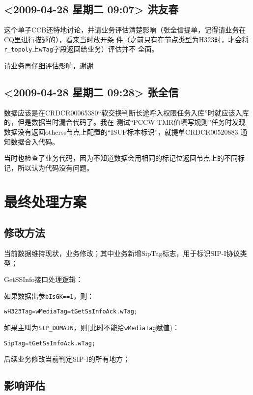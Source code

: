 \documentclass[12pt,a4paper,onecolumn]{article}
\begin{document}
\subsection{<2009-04-28 星期二 09:07> 洪友春}

这个单子CCB还特地讨论，并请业务评估清楚影响（张全信提单，记得请业务在CQ里进行描述的），看来当时放开条
件（之前只有在节点类型为H323时，才会将\lstinline{r_topoly}上\lstinline{wTag}字段返回给业务）评估并不
全面。

请业务再仔细评估影响，谢谢
\subsection{<2009-04-28 星期二 09:28> 张全信}

数据应该是在CRDCR00065380“软交换判断长途呼入权限任务入库”时就应该入库的，但是数据当时漏合代码了。我在
测试“PCCW TMR值填写规则”任务时发现数据没有返回otherss节点上配置的“ISUP标本标识”，就提单CRDCR00520883
通知数据合入代码。

当时也检查了业务代码，因为不知道数据会用相同的标记位返回节点上的不同标记，所以认为代码没有问题。
\section{最终处理方案}
\subsection{修改方法}

当前数据维持现状，业务修改；其中业务新增SipTag标志，用于标识SIP-I协议类型；

GetSSInfo接口处理逻辑：

如果数据出参\lstinline{bIsGK==1}，则：
\begin{footnotesize}
\begin{lstlisting}
wH323Tag=wMediaTag=tGetSsInfoAck.wTag;
\end{lstlisting}
\end{footnotesize}

如果主叫为\lstinline{SIP_DOMAIN}，则(此时不能给\lstinline{wMediaTag}赋值)：

\begin{footnotesize}
\begin{lstlisting}
SipTag=tGetSsInfoAck.wTag;
\end{lstlisting}
\end{footnotesize}

后续业务修改当前判定SIP-I的所有地方；

\subsection{影响评估}
\end{document}
